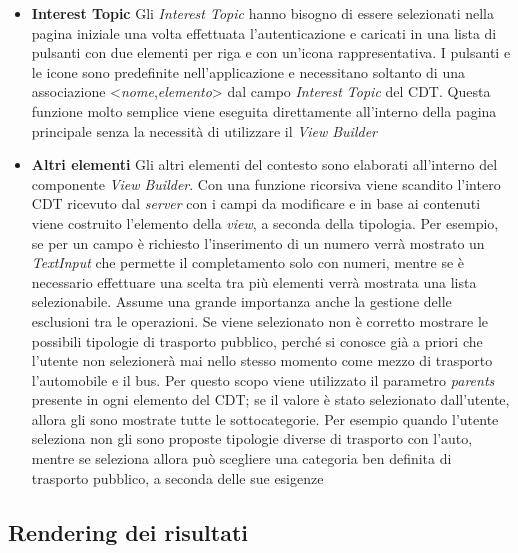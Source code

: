 \begin{itemize}
	\item \textbf{Interest Topic}
	Gli \emph{Interest Topic} hanno bisogno di essere selezionati nella pagina iniziale una volta effettuata l'autenticazione e caricati in una lista di pulsanti con due elementi per riga e con un'icona rappresentativa. I pulsanti e le icone sono predefinite nell'applicazione e necessitano soltanto di una associazione <\emph{nome},\emph{elemento}> dal campo \emph{Interest Topic} del CDT. Questa funzione molto semplice viene eseguita direttamente all'interno della pagina principale senza la necessità di utilizzare il \emph{View Builder}
	\item \textbf{Altri elementi}
	Gli altri elementi del contesto sono elaborati all'interno del componente \emph{View Builder}. Con una funzione ricorsiva viene scandito l'intero CDT ricevuto dal \emph{server} con i campi da modificare e in base ai contenuti viene costruito l'elemento della \emph{view}, a seconda della tipologia. Per esempio, se per un campo è richiesto l'inserimento di un numero verrà mostrato un \emph{TextInput} che permette il completamento solo con numeri, mentre se è necessario effettuare una scelta tra più elementi verrà mostrata una lista selezionabile.
	Assume una grande importanza anche la gestione delle esclusioni tra le operazioni. Se viene selezionato  non è corretto mostrare le possibili tipologie di trasporto pubblico, perché si conosce già a priori che l'utente non selezionerà mai nello stesso momento come mezzo di trasporto l'automobile e il bus. Per questo scopo viene utilizzato il parametro \emph{parents} presente in ogni elemento del CDT; se il valore è stato selezionato dall'utente, allora gli sono mostrate tutte le sottocategorie. Per esempio quando l'utente seleziona  non gli sono proposte tipologie diverse di trasporto con l'auto, mentre se seleziona  allora può scegliere una categoria ben definita di trasporto pubblico, a seconda delle sue esigenze
\end{itemize}
	
\subsection{Rendering dei risultati}\label{sec:view-risultati}

